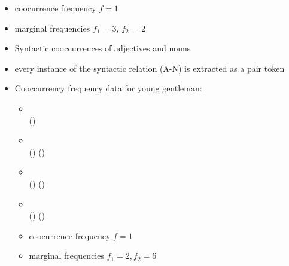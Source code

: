 \documentclass[a4paper,landscape,headrule,footrule,xetex]{foils}
\begin{document}
\begin{itemize}
\item coocurrence frequency $f = 1$
\item marginal frequencies $f_1$ = 3, $f_2$ = 2
\end{itemize}


\begin{itemize}
\item Syntactic cooccurrences of adjectives and nouns
\item every instance of the syntactic relation (A-N) is
extracted as a pair token
\end{itemize}



\begin{itemize}
\item  Cooccurrency frequency data for young gentleman:
  \begin{small}
    \begin{itemize}
    \item {}  \\ ()
    \item {}  \\ () ()
    \item {}  \\ ()
      ()
    \item {}  
      \\ () ()
    \end{itemize}
  \end{small}
 \begin{itemize}
    \item coocurrence frequency $f = 1$
    \item marginal frequencies $f_1 = 2, f_2 = 6$
\end{itemize}
\end{itemize}
\end{document}
